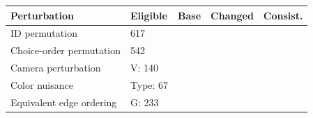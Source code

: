 \begin{tabular}{llrrr}
\toprule
Perturbation & Eligible & Base & Changed & Consist.\\\midrule
ID permutation & 617 &  &  & \\
Choice-order permutation & 542 &  &  & \\
Camera perturbation & V: 140 &  &  & \\
Color nuisance & Type: 67 &  &  & \\
Equivalent edge ordering & G: 233 &  &  & \\
\bottomrule
\end{tabular}
